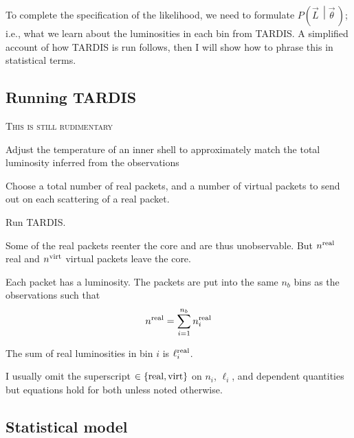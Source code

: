 \documentclass[a4,12pt]{article}
\newcommand{\given}[2]{\left(#1\, \middle| #2 \, \right)}
\newcommand{\lumi}{\ensuremath{\ell_i}}
\newcommand{\real}{\ensuremath{{\rm real}}}
\newcommand{\virt}{\ensuremath{{\rm virt}}}
\newcommand{\vecL}{\ensuremath{\vec{L}}}
\newcommand{\vecth}{\ensuremath{{\vec{\theta}}}}
\newcommand{\todo}[1]{{\textsc{\color{red}#1}}}
\newcommand{\tardis}{TARDIS}
\begin{document}
To complete the specification of the likelihood, we need to formulate
$P\given{\vecL}{\vecth}$; i.e., what we learn about the luminosities
in each bin from \tardis. A simplified account of how \tardis{} is run
follows, then I will show how to phrase this in statistical terms.

\subsection{Running \tardis}
\todo{This is still rudimentary}
\begin{compactenum}[(I)]
  \item Adjust the temperature of an inner shell to approximately match
    the total luminosity inferred from the observations
  \item Choose a total number of real packets, and a number of virtual
    packets to send out on each scattering of a real packet.
  \item Run \tardis.
  \item Some of the real packets reenter the core and are thus
    unobservable. But $n^\real$ real and $n^\virt$ virtual packets
    leave the core.
  \item Each packet has a luminosity. The packets are put into the
    same $n_b$ bins as the observations such that
    \begin{align}
      \label{eq:bin-packets}
      n^\real = \sum_{i=1}^{n_b} n_i^\real
    \end{align}
  \item The sum of real luminosities in bin $i$ is $\lumi^\real$.
\end{compactenum}
I usually omit the superscript $\in \{\real, \virt\}$ on $n_i$,
$\lumi$, and dependent quantities but equations hold for both unless
noted otherwise.

\subsection{Statistical model}
\end{document}
